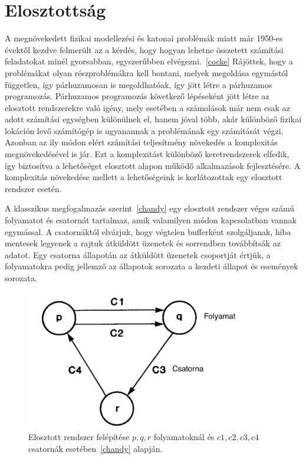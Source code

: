 \documentclass[a4paper,12pt]{article}
\begin{document}
\section{Elosztottság}
A megnövekedett fizikai modellezési és katonai problémák miatt már 1950-es évektől kezdve felmerült az a kérdés, hogy hogyan lehetne összetett számítási feladatokat minél gyorsabban, egyszerűbben elvégezni.~\ref{cocke} Rájöttek, hogy a problémákat olyan részproblémákra kell bontani, melyek megoldása egymástól független, így párhuzamosan is megoldhatóak, így jött létre a párhuzamos programozás. \linebreak
Párhuzamos programozás következő lépéseként jött létre az elosztott rendszerekre való igény, mely esetében a számolások már nem csak az adott számítási egységben különülnek el, hanem jóval több, akár különböző fizikai lokáción levő számítógép is ugyanannak a problémának egy számítását végzi. Azonban az ily módon elért számítási teljesítmény növekedés a komplexitás megnövekedésével is jár. Ezt a komplexitást különböző keretrendszerek elfedik, így biztosítva a lehetőséget elosztott alapon működő alkalmazások fejlesztésére. A komplexitás növekedése mellett a lehetőségeink is korlátozottak egy elosztott rendszer esetén. \linebreak

A klasszikus megfogalmazás szerint~\ref{chandy} egy elosztott rendszer véges számú folyamatot és csatornát tartalmaz, amik valamilyen módon kapcsolatban vannak egymással. A csatornáktól elvárjuk, hogy végtelen bufferként szolgáljanak, hiba mentesek legyenek a rajtuk átküldött üzenetek és sorrendben továbbítsák az adatot. Egy csatorna állapotán az átküldött üzenetek csoportját értjük, a folyamatokra pedig jellemző az állapotok sorozata a kezdeti állapot és események sorozata.

\begin{figure}[H]
\centering
\includegraphics[width=100mm]{img/distSys.png}
\caption{Elosztott rendszer felépítése $p, q, r$ folyamatoknál és $c1, c2, c3, c4$ csatornák esetében~\ref{chandy} alapján.
\label{distSys}}
\end{figure}
\end{document}
